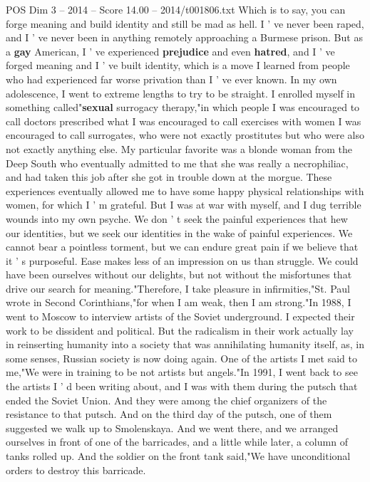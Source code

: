 \begin{textsample}{POS Dim 3 – 2014 – Score 14.00 – 2014/t001806.txt}
Which is to say, you can forge meaning and build identity and still be mad as hell.
I ' ve never been raped, and I ' ve never been in anything remotely approaching a Burmese prison.
But as a \textbf{gay} American, I ' ve experienced \textbf{prejudice} and even \textbf{hatred}, and I ' ve forged meaning and I ' ve built identity, which is a move I learned from people who had experienced far worse privation than I ' ve ever known.
In my own adolescence, I went to extreme lengths to try to be straight.
I enrolled myself in something called"\textbf{sexual} surrogacy therapy,"in which people I was encouraged to call doctors prescribed what I was encouraged to call exercises with women I was encouraged to call surrogates, who were not exactly prostitutes but who were also not exactly anything else.
My particular favorite was a blonde woman from the Deep South who eventually admitted to me that she was really a necrophiliac, and had taken this job after she got in trouble down at the morgue.
These experiences eventually allowed me to have some happy physical relationships with women, for which I ' m grateful.
But I was at war with myself, and I dug terrible wounds into my own psyche.
We don ' t seek the painful experiences that hew our identities, but we seek our identities in the wake of painful experiences.
We cannot bear a pointless torment, but we can endure great pain if we believe that it ' s purposeful.
Ease makes less of an impression on us than struggle.
We could have been ourselves without our delights, but not without the misfortunes that drive our search for meaning."Therefore, I take pleasure in infirmities,"St.
Paul wrote in Second Corinthians,"for when I am weak, then I am strong."In 1988, I went to Moscow to interview artists of the Soviet underground.
I expected their work to be dissident and political.
But the radicalism in their work actually lay in reinserting humanity into a society that was annihilating humanity itself, as, in some senses, Russian society is now doing again.
One of the artists I met said to me,"We were in training to be not artists but angels."In 1991, I went back to see the artists I ' d been writing about, and I was with them during the putsch that ended the Soviet Union.
And they were among the chief organizers of the resistance to that putsch.
And on the third day of the putsch, one of them suggested we walk up to Smolenskaya.
And we went there, and we arranged ourselves in front of one of the barricades, and a little while later, a column of tanks rolled up.
And the soldier on the front tank said,"We have unconditional orders to destroy this barricade.

\end{textsample}
